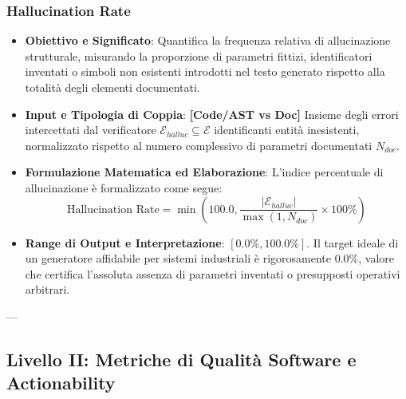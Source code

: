 \subsubsection{Hallucination Rate}
\label{subsubsec:hallucination_rate}
\begin{itemize}[leftmargin=*, label=\textbullet]
    \item \textbf{Obiettivo e Significato}: Quantifica la frequenza relativa di allucinazione strutturale, misurando la proporzione di parametri fittizi, identificatori inventati o simboli non esistenti introdotti nel testo generato rispetto alla totalità degli elementi documentati.
    \item \textbf{Input e Tipologia di Coppia}: \textbf{[Code/AST vs Doc]} Insieme degli errori intercettati dal verificatore $\mathcal{E}_{halluc} \subseteq \mathcal{E}$ identificanti entità inesistenti, normalizzato rispetto al numero complessivo di parametri documentati $N_{doc}$.
    \item \textbf{Formulazione Matematica ed Elaborazione}: L'indice percentuale di allucinazione è formalizzato come segue:
    \begin{equation}
        \text{Hallucination Rate} = \min\left(100.0, \frac{|\mathcal{E}_{halluc}|}{\max(1, N_{doc})} \times 100\%\right)
        \label{eq:hallucination_rate}
    \end{equation}
    \item \textbf{Range di Output e Interpretazione}: $[0.0\%, 100.0\%]$. Il target ideale di un generatore affidabile per sistemi industriali è rigorosamente $0.0\%$, valore che certifica l'assoluta assenza di parametri inventati o presupposti operativi arbitrari.
\end{itemize}

---

\subsection{Livello II: Metriche di Qualità Software e Actionability}

